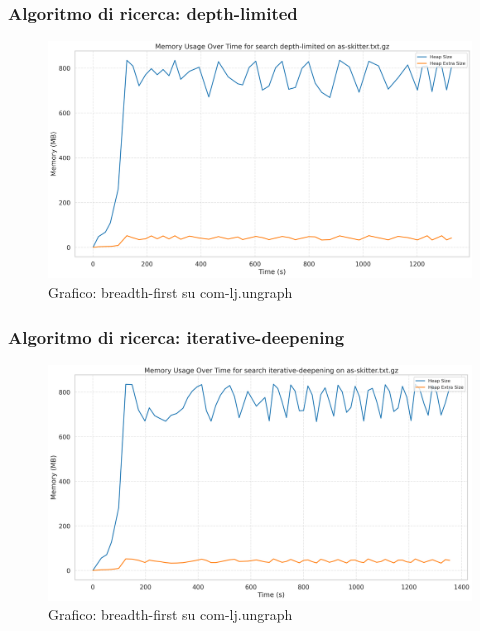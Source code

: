 \documentclass{article}
\begin{document}
\subsubsection{Algoritmo di ricerca: depth-limited}
\begin{figure}[h]\centering
\includegraphics[width=\textwidth]{../plots/as-skitter_depth-limited.png}
\caption{Grafico: breadth-first su com-lj.ungraph}
\end{figure}
\subsubsection{Algoritmo di ricerca: iterative-deepening}
\begin{figure}[h]\centering
\includegraphics[width=\textwidth]{../plots/as-skitter_iterative-deepening.png}
\caption{Grafico: breadth-first su com-lj.ungraph}
\end{figure}
\end{document}
